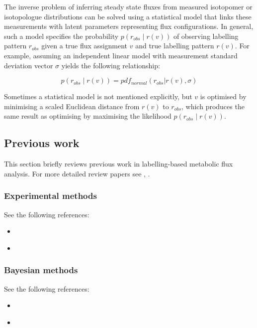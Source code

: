 \documentclass{article}
\def\tightlist{}
\begin{document}
The inverse problem of inferring steady state fluxes from measured
isotopomer or isotopologue distributions can be solved using a
statistical model that links these measurements with latent parameters
representing flux configurations. In general, such a model specifies the
probability \(p(r_{obs}\mid r(v))\) of observing labelling pattern
\(r_{obs}\) given a true flux assignment \(v\) and true labelling
pattern \(r(v)\). For example, assuming an independent linear model with
measurement standard deviation vector \(\sigma\) yields the following
relationship:

\[
p(r_{obs}\mid r(v)) = pdf_{normal}(r_{obs} | r(v), \sigma)
\label{linear}
\]

Sometimes a statistical model is not mentioned explicitly, but \(v\) is
optimised by minimising a scaled Euclidean distance from \(r(v)\) to
\(r_{obs}\), which produces the same result as optimising by maximising
the likelihood \hyperref[linear]{\(p(r_{obs}\mid r(v))\)}.

\subsection{Previous work}\label{previous-work}

This section briefly reviews previous work in labelling-based metabolic
flux analysis. For more detailed review papers see
\citep{daiUnderstandingMetabolismFlux2017},
\citep{falcoMetabolicFluxAnalysis2022}.

\subsubsection{Experimental methods}\label{experimental-methods}

See the following references:

\begin{itemize}
\tightlist
\item
  \citep{longHighresolution13CMetabolic2019}
\item
  \citep{falcoMetabolicFluxAnalysis2022}
\end{itemize}

\subsubsection{Bayesian methods}\label{bayesian-methods}

See the following references:

\begin{itemize}
\tightlist
\item
  \citep{theorellBeCertainUncertainty2017}
\item
  \citep{theorellReversibleJumpMCMC2020}
\end{itemize}
\end{document}
